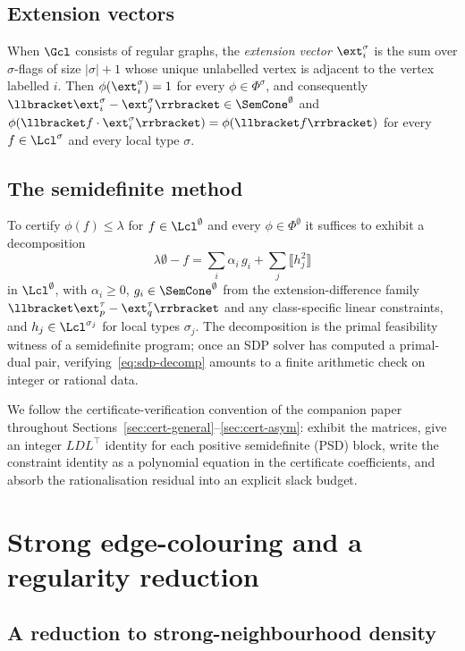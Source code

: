 \documentclass[11pt,a4paper]{article}
\theoremstyle{definition}
\theoremstyle{remark}
\begin{document}
\subsection{Extension vectors}
When $\Gcl$ consists of regular graphs, the \emph{extension vector}
$\ext_i^\sigma$ is the sum over $\sigma$-flags of size $|\sigma|+1$
whose unique unlabelled vertex is adjacent to the vertex labelled
$i$. Then $\phi(\ext_i^\sigma) = 1$ for every $\phi \in \Phi^\sigma$,
and consequently
$\llbracket \ext_i^\sigma - \ext_j^\sigma \rrbracket \in
\SemCone^\emptyset$ and
$\phi(\llbracket f \cdot \ext_i^\sigma \rrbracket) = \phi(\llbracket f
\rrbracket)$ for every $f \in \Lcl^\sigma$ and every local type
$\sigma$.

\subsection{The semidefinite method}
To certify $\phi(f) \leq \lambda$ for $f \in \Lcl^\emptyset$ and
every $\phi \in \Phi^\emptyset$ it suffices to exhibit a
decomposition
\begin{equation}
\label{eq:sdp-decomp}
\lambda \emptyset - f
= \sum_i \alpha_i\,g_i
+ \sum_j \bigl\llbracket h_j^2 \bigr\rrbracket
\end{equation}
in $\Lcl^\emptyset$, with $\alpha_i \geq 0$, $g_i \in
\SemCone^\emptyset$ from the extension-difference family
$\llbracket \ext_p^\tau - \ext_q^\tau \rrbracket$ and any class-specific
linear constraints, and $h_j \in \Lcl^{\sigma_j}$ for local types
$\sigma_j$. The decomposition is the primal feasibility witness of a
semidefinite program; once an SDP solver has computed a primal-dual
pair, verifying~\eqref{eq:sdp-decomp} amounts to a finite
arithmetic check on integer or rational data.

We follow the certificate-verification convention of the companion
paper throughout
Sections~\ref{sec:cert-general}--\ref{sec:cert-asym}: exhibit the
matrices, give an integer $LDL^\top$ identity for each positive
semidefinite (PSD) block, write the
constraint identity as a polynomial equation in the certificate coefficients,
and absorb the rationalisation residual into an explicit slack budget.

\section{Strong edge-colouring and a regularity reduction}
\label{sec:problem}

\subsection{A reduction to strong-neighbourhood density}
\end{document}
